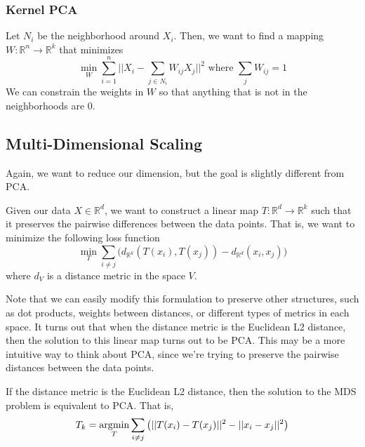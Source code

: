     \subsubsection{Kernel PCA}

      \begin{definition}
        Let $N_i$ be the neighborhood around $X_i$. Then, we want to find a mapping $W: \mathbb{R}^n \rightarrow \mathbb{R}^k$ that minimizes 
        \begin{equation}
          \min_{W} \sum_{i=1}^n \bigg| \bigg| X_i - \sum_{j \in N_i} W_{ij} X_j \bigg| \bigg|^2 \text{ where } \sum_{j} W_{ij} = 1
        \end{equation}
        We can constrain the weights in $W$ so that anything that is not in the neighborhoods are $0$. 
      \end{definition}

  \subsection{Multi-Dimensional Scaling}

    Again, we want to reduce our dimension, but the goal is slightly different from PCA. 

    \begin{definition}
      Given our data $X \in \mathbb{R}^d$, we want to construct a linear map $T: \mathbb{R}^d \rightarrow \mathbb{R}^k$ such that it preserves the pairwise differences between the data points. That is, we want to minimize the following loss function 
      \begin{equation}
        \min_{T} \sum_{i \neq j} \big( d_{\mathbb{R}^k}(T(x_i), T(x_j)) - d_{\mathbb{R}^d}(x_i, x_j) \big)
      \end{equation}
      where $d_{V}$ is a distance metric in the space $V$. 
    \end{definition}

    Note that we can easily modify this formulation to preserve other structures, such as dot products, weights between distances, or different types of metrics in each space. It turns out that when the distance metric is the Euclidean L2 distance, then the solution to this linear map turns out to be PCA. This may be a more intuitive way to think about PCA, since we're trying to preserve the pairwise distances between the data points. 

    \begin{theorem}
      If the distance metric is the Euclidean L2 distance, then the solution to the MDS problem is equivalent to PCA. That is, 
      \begin{equation}
        T_k = \operatorname*{\arg\!\min}_{T} \sum_{i \neq j} \big( ||T(x_i) - T(x_j)||^2 - ||x_i - x_j||^2 \big)
      \end{equation}
    \end{theorem}

